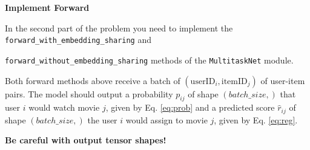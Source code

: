 \item {} {\bf Implement Forward}

In the second part of the problem you need to implement 
the \texttt{forward\_with\_embedding\_sharing} and 

\texttt{forward\_without\_embedding\_sharing} methods of the 
\texttt{MultitaskNet} module. 


Both forward methods above receive a batch of $(\text{userID}_i, \text{itemID}_j)$ 
of user-item pairs. The model should output a probability $p_{ij}$ of 
shape $(batch\_size,)$ that user $i$ would watch movie $j$, 
given by Eq. \ref{eq:prob} and a predicted score $\hat{r}_{ij}$ 
of shape $(batch\_size,)$ the user $i$ would assign to movie $j$, 
given by Eq. \ref{eq:reg}. 

\textbf{Be careful with output tensor shapes!}

\clearpage
